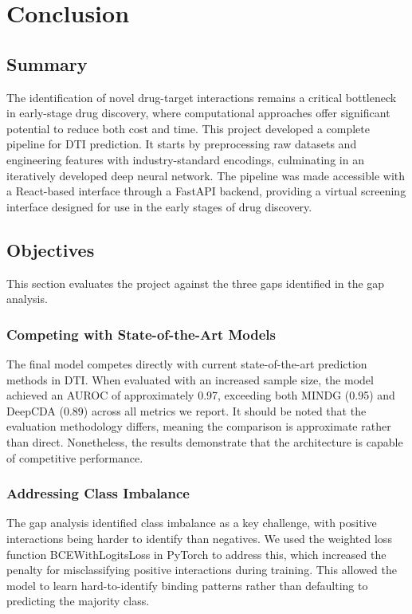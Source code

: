 \chapter{Conclusion}
\label{ch:conclusion}
\section{Summary}
The identification of novel drug-target interactions remains a critical bottleneck in early-stage drug discovery, where computational approaches offer significant potential to reduce both cost and time.
This project developed a complete pipeline for DTI prediction.
It starts by preprocessing raw datasets and engineering features with industry-standard encodings, culminating in an iteratively developed deep neural network.
The pipeline was made accessible with a React-based interface through a FastAPI backend, providing a virtual screening interface designed for use in the early stages of drug discovery.

\section{Objectives}
\label{sec:objectives}
This section evaluates the project against the three gaps identified in the gap analysis.
\subsection{Competing with State-of-the-Art Models}
\label{subsec:competing-with-state-of-the-art-models}
The final model competes directly with current state-of-the-art prediction methods in DTI.
When evaluated with an increased sample size, the model achieved an AUROC of approximately 0.97, exceeding both MINDG (0.95) and DeepCDA (0.89) across all metrics we report.
It should be noted that the evaluation methodology differs, meaning the comparison is approximate rather than direct.
Nonetheless, the results demonstrate that the architecture is capable of competitive performance.
\subsection{Addressing Class Imbalance}
\label{subsec:addressing-class-imbalance}
The gap analysis identified class imbalance as a key challenge, with positive interactions being harder to identify than negatives.
We used the weighted loss function BCEWithLogitsLoss in PyTorch to address this, which increased the penalty for misclassifying positive interactions during training.
This allowed the model to learn hard-to-identify binding patterns rather than defaulting to predicting the majority class.
